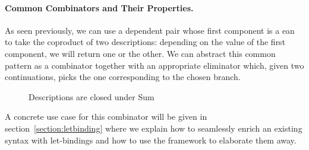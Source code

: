 \paragraph{Common Combinators and Their Properties.}\label{desccomb}

As seen previously, we can use a dependent pair whose first component
is a ean to take the coproduct of two descriptions: depending
on the value of the first component, we will return one or the other.
We can abstract this common pattern as a combinator  together
with an appropriate eliminator  which, given two continuations,
picks the one corresponding to the chosen branch.

\begin{figure}[h]
\begin{minipage}{0.35\textwidth}
\end{minipage}\hfill
\begin{minipage}{0.55\textwidth}
\end{minipage}
\caption{Descriptions are closed under Sum}\label{figure:descsum}
\end{figure}



A concrete use case for this combinator will be given in
section~\ref{section:letbinding}
where we explain how to seamlessly enrich an existing syntax with let-bindings
and how to use the \semrec{} framework to elaborate them away.


